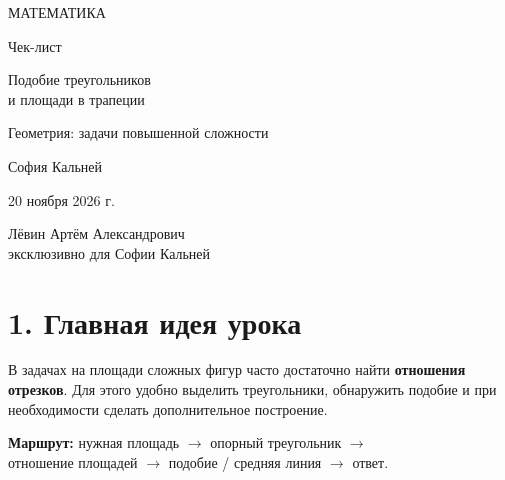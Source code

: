 \documentclass[a4paper,12pt]{article}
\newcommand{\key}[1]{\textcolor{darkaccent}{\textbf{#1}}}
\newcommand{\smallrule}{\par\vspace{1mm}\noindent{\color{accent}\rule{\linewidth}{.45pt}}\par\vspace{1mm}}
\begin{document}
\thispagestyle{empty}
\begin{center}
\vspace*{26mm}
{\Large\color{darkaccent} МАТЕМАТИКА}\par
\vspace{16mm}
{\Huge\color{textgray} Чек-лист}\par
\vspace{12mm}
{\LARGE\color{accent} Подобие треугольников\\[3mm] и площади в трапеции}\par
\vspace{12mm}
{\large Геометрия: задачи повышенной сложности}\par
\vspace{32mm}
{\large София Кальней}\par
\vspace{10mm}
{\large 20 ноября 2026 г.}\par
\vfill
{\small Лёвин Артём Александрович\\эксклюзивно для Софии Кальней}\par
\vspace{14mm}
\end{center}
\clearpage

\section*{1. Главная идея урока}
В задачах на площади сложных фигур часто достаточно найти \key{отношения отрезков}. Для этого удобно выделить треугольники, обнаружить подобие и при необходимости сделать дополнительное построение.

\smallrule
\key{Маршрут:} нужная площадь $\to$ опорный треугольник $\to$\\
отношение площадей $\to$ подобие / средняя линия $\to$ ответ.
\end{document}
